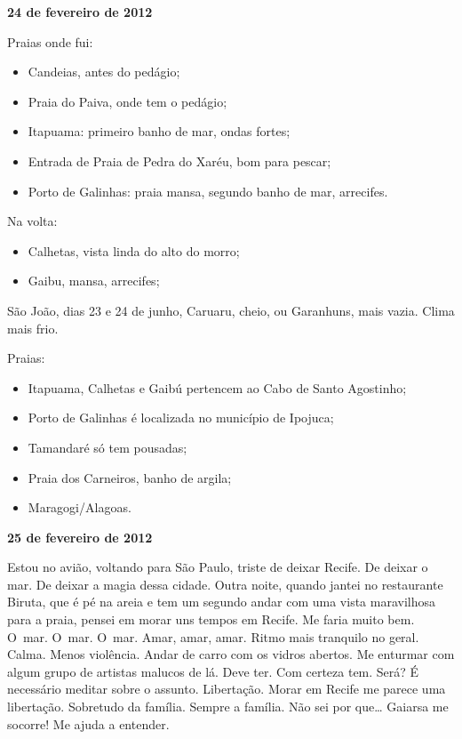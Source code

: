 \begin{flushright}\textbf{24 de fevereiro de 2012}\end{flushright}


Praias onde fui:

\begin{itemize}
\item
  Candeias, antes do pedágio;
\item
  Praia do Paiva, onde tem o pedágio;
\item
  Itapuama: primeiro banho de mar, ondas fortes;
\item
  Entrada de Praia de Pedra do Xaréu, bom para pescar;
\item
  Porto de Galinhas: praia mansa, segundo banho de mar, arrecifes.
\end{itemize}
Na volta:

\begin{itemize}
\item
  Calhetas, vista linda do alto do morro;
\item
  Gaibu, mansa, arrecifes;
\end{itemize}
São João, dias 23 e 24 de junho, Caruaru, cheio, ou Garanhuns, mais
vazia. Clima mais frio.

Praias:

\begin{itemize}
\item
  Itapuama, Calhetas e Gaibú pertencem ao Cabo de Santo Agostinho;
\item
  Porto de Galinhas é localizada no município de Ipojuca;
\item
  Tamandaré só tem pousadas;
\item
  Praia dos Carneiros, banho de argila;
\item
  Maragogi/Alagoas.
\end{itemize}

\begin{center}\asterisc{}\end{center}

\begin{flushright}\textbf{25 de fevereiro de 2012}\end{flushright}


Estou no avião, voltando para São Paulo, triste de deixar Recife. De
deixar o mar. De deixar a magia dessa cidade. Outra noite, quando jantei
no restaurante Biruta, que é pé na areia e tem um segundo andar com uma
vista maravilhosa para a praia, pensei em morar uns tempos em Recife. Me
faria muito bem. O~mar. O~mar. O~mar. Amar, amar, amar. Ritmo mais
tranquilo no geral. Calma. Menos violência. Andar de carro com os
vidros abertos. Me enturmar com algum grupo de artistas malucos de lá.
Deve ter. Com certeza tem. Será? É necessário meditar sobre o assunto.
Libertação. Morar em Recife me parece uma libertação. Sobretudo da
família. Sempre a família. Não sei por que… Gaiarsa me socorre!
Me ajuda a entender.

